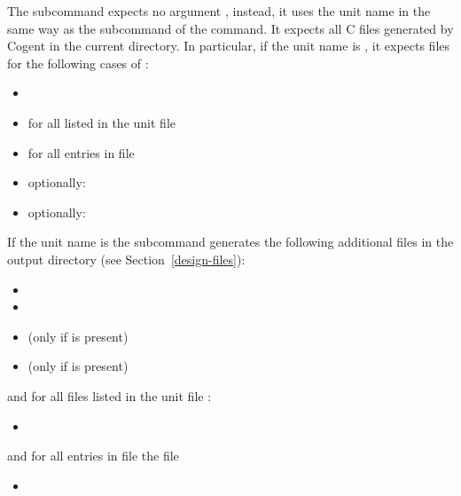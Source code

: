 The subcommand  expects no argument , instead, it uses the unit name in the same way as the subcommand  
of the  command. It expects all C files generated by Cogent in the current directory. In particular, if the unit name 
is , it expects files  for the following cases of :
\begin{itemize}
\item {}
\item {} for all  listed in the unit file 
\item {} for all entries  in file 
\item optionally: 
\item optionally: 
\end{itemize}

If the unit name is  the subcommand  generates the following additional files in the output 
directory (see Section~\ref{design-files}):
\begin{itemize}
\item {}
\item {}
\item {} (only if  is present)
\item {} (only if  is present)
\end{itemize}
and for all files  listed in the unit file :
\begin{itemize}
\item {}
\end{itemize}
and for all entries  in file  the file
\begin{itemize}
\item {}
\end{itemize}

